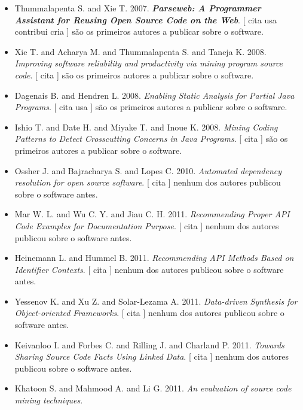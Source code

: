 \begin{itemize}
\item Thummalapenta S. and Xie T.
      2007.
        \textbf{\textit{ Parseweb: A Programmer Assistant for Reusing Open Source Code on the Web}}.
      [
          cita
          usa
          contribui
          cria
      ]
são os primeiros autores a publicar sobre o software.
\item Xie T. and Acharya M. and Thummalapenta S. and Taneja K.
      2008.
        \textit{ Improving software reliability and productivity via mining program source code}.
      [
          cita
      ]
são os primeiros autores a publicar sobre o software.
\item Dagenais B. and Hendren L.
      2008.
        \textit{ Enabling Static Analysis for Partial Java Programs}.
      [
          cita
          usa
      ]
são os primeiros autores a publicar sobre o software.
\item Ishio T. and Date H. and Miyake T. and Inoue K.
      2008.
        \textit{ Mining Coding Patterns to Detect Crosscutting Concerns in Java Programs}.
      [
          cita
      ]
são os primeiros autores a publicar sobre o software.
\item Ossher J. and Bajracharya S. and Lopes C.
      2010.
        \textit{ Automated dependency resolution for open source software}.
      [
          cita
      ]
nenhum dos autores publicou sobre o software antes.
\item Mar W. L. and Wu C. Y. and Jiau C. H.
      2011.
        \textit{ Recommending Proper API Code Examples for Documentation Purpose}.
      [
          cita
      ]
nenhum dos autores publicou sobre o software antes.
\item Heinemann L. and Hummel B.
      2011.
        \textit{ Recommending API Methods Based on Identifier Contexts}.
      [
          cita
      ]
nenhum dos autores publicou sobre o software antes.
\item Yessenov K. and Xu Z. and Solar-Lezama A.
      2011.
        \textit{ Data-driven Synthesis for Object-oriented Frameworks}.
      [
          cita
      ]
nenhum dos autores publicou sobre o software antes.
\item Keivanloo I. and Forbes C. and Rilling J. and Charland P.
      2011.
        \textit{ Towards Sharing Source Code Facts Using Linked Data}.
      [
          cita
      ]
nenhum dos autores publicou sobre o software antes.
\item Khatoon S. and Mahmood A. and Li G.
      2011.
        \textit{ An evaluation of source code mining techniques}.

\end{itemize}

